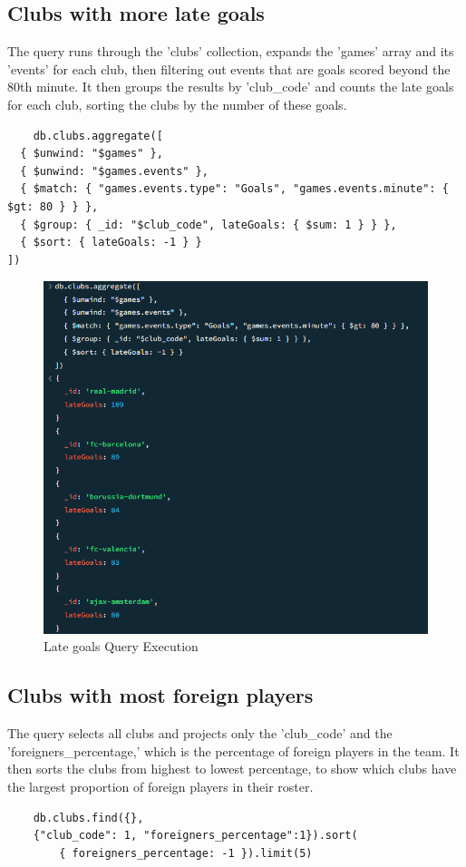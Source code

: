 \documentclass{Configuration_Files/PoliMi3i_thesis}
\begin{document}
\subsection{Clubs with more late goals}
The query runs through the 'clubs' collection, expands the 'games' array and its 'events' for each club, then filtering out events that are goals scored beyond the 80th minute. It then groups the results by 'club\_code' and counts the late goals for each club, sorting the clubs by the number of these goals.
\begin{verbatim}
    db.clubs.aggregate([
  { $unwind: "$games" },
  { $unwind: "$games.events" },
  { $match: { "games.events.type": "Goals", "games.events.minute": { $gt: 80 } } },
  { $group: { _id: "$club_code", lateGoals: { $sum: 1 } } },
  { $sort: { lateGoals: -1 } }
])
\end{verbatim}
\begin{figure}[htbp]
    \centering
    \includegraphics[scale=0.8]{Images/Queries/Clubs/late_goals_per_club/lgpc.png}
    \caption{Late goals Query Execution}
\end{figure}
\subsection{Clubs with most foreign players}
The query selects all clubs and projects only the 'club\_code' and the 'foreigners\_percentage,' which is the percentage of foreign players in the team. It then sorts the clubs from highest to lowest percentage, to show which clubs have the largest proportion of foreign players in their roster.
\begin{verbatim}
    db.clubs.find({}, 
    {"club_code": 1, "foreigners_percentage":1}).sort(
        { foreigners_percentage: -1 }).limit(5)
\end{verbatim}
\end{document}
